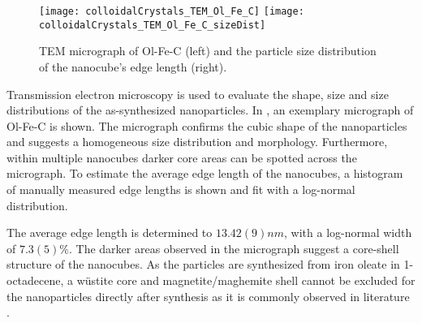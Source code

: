 \documentclass[\main/dresen_thesis.tex]{subfiles}
\begin{document}
  \label{sec:colloidalCrystals:nanoparticle:tem}
  \begin{figure}[!htbp]
    \centering
    \texttt{[image: colloidalCrystals\_TEM\_Ol\_Fe\_C]}
    \texttt{[image: colloidalCrystals\_TEM\_Ol\_Fe\_C\_sizeDist]}
    \caption{\label{fig:colloidalCrystals:nanoparticle:tem}TEM micrograph of Ol-Fe-C (left) and the particle size distribution of the nanocube's edge length (right).}
  \end{figure}

  Transmission electron microscopy is used to evaluate the shape, size and size distributions of the as-synthesized nanoparticles.
  In , an exemplary micrograph of Ol-Fe-C is shown.
  The micrograph confirms the cubic shape of the nanoparticles and suggests a homogeneous size distribution and morphology.
  Furthermore, within multiple nanocubes darker core areas can be spotted across the micrograph.
  To estimate the average edge length of the nanocubes, a histogram of manually measured edge lengths is shown and fit with a log-normal distribution.

  The average edge length is determined to $13.42(9) \unit{nm}$, with a log-normal width of $7.3(5) \unit{\%}$.
  The darker areas observed in the micrograph suggest a core-shell structure of the nanocubes.
  As the particles are synthesized from iron oleate in 1-octadecene, a w\"ustite core and magnetite/maghemite shell cannot be excluded for the nanoparticles directly after synthesis as it is commonly observed in literature \cite{Wetterskog_2013_Anoma}.
\end{document}

